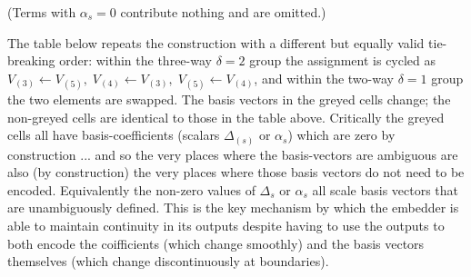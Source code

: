 \documentclass[11pt,a4paper]{article}
\begin{document}
\noindent
(Terms with $\alpha_s=0$ contribute nothing and are omitted.)

\noindent
The table below repeats the construction with a different but equally valid
tie-breaking order: within the three-way $\delta\!=\!2$ group the assignment
is cycled as $V_{(3)}\!\leftarrow\!V_{(5)},\;V_{(4)}\!\leftarrow\!V_{(3)},\;
V_{(5)}\!\leftarrow\!V_{(4)}$, and within the two-way $\delta\!=\!1$ group the
two elements are swapped.  The basis vectors in the greyed cells change; the non-greyed cells
are identical to those in the table above.  Critically the greyed cells all have basis-coefficients
(scalars  $\Delta_{(s)}$ or $\alpha_{s}$) which are zero by construction ... and so
 the very places where the basis-vectors are ambiguous are also (by construction)
  the very places where those basis vectors do not need to be encoded. Equivalently the
   non-zero values of $\Delta_s$ or $\alpha_s$ all scale basis vectors that are unambiguously defined.
    This is the key mechanism by which the embedder is able to maintain continuity in its outputs despite
      having to use the outputs to both encode the coifficients (which change smoothly) and the basis vectors
      themselves (which change discontinuously at boundaries).
\end{document}
